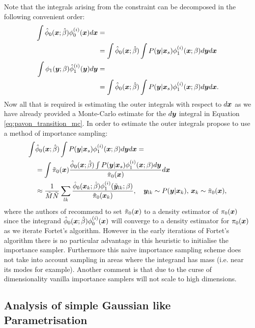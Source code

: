 \documentclass[a4paper,12pt,twoside,openright]{report}
\theoremstyle{definition}
\begin{document}
\cite{pavon2018data} Note that the integrals arising from the constraint can be decomposed in the following convenient order:
\begin{align}
\int {\hat{\phi}}_0({\bm{x}}; \hat{\beta} )   \phi_0^{(i)}({\bm{x}}) d{\bm{x}} &=\nonumber\\
& = \int  {\hat{\phi}}_0({\bm{x}}; \hat{\beta} ) \int P({\bm{y}}| {\bm{x}}_s) \phi_1^{(i)}({\bm{x}}; \beta) d{\bm{y}} d{\bm{x}} \\
    \int \phi_1({\bm{y}}; {\beta} )   {\hat{\phi}}_1^{(i)}({\bm{y}}) d{\bm{y}} &=\nonumber\\
    &=\int  {\hat{\phi}}_0({\bm{x}}; \hat{\beta} ) \int P({\bm{y}}| {\bm{x}}_s) \phi_1^{(i)}({\bm{x}}; \beta) d{\bm{y}} d{\bm{x}}.
\end{align}
Now all that is required is estimating the outer integrals with respect to $d{\bm{x}}$ as we have already provided a Monte-Carlo estimate for the $d{\bm{y}}$ integral in Equation \ref{eq:pavon_transition_mc}. In order to estimate the outer integrals  \cite{pavon2018data} propose to use a method of importance sampling:
\begin{align}
    \int&  {\hat{\phi}}_0({\bm{x}}; \hat{\beta} ) \int P({\bm{y}}| {\bm{x}}_s) \phi_1^{(i)}({\bm{x}}; \beta) d{\bm{y}} d{\bm{x}} = \nonumber \\
    & = \int \tilde{\pi}_0({\bm{x}}) \frac{{\hat{\phi}}_0({\bm{x}}; \hat{\beta} ) \int P({\bm{y}}| {\bm{x}}_s) \phi_1^{(i)}({\bm{x}}; \beta) d{\bm{y}}}{\tilde{\pi}_0({\bm{x}})} d{\bm{x}} \nonumber \\ 
     &\approx  \frac{1}{\tilde{M}\tilde{N}}\sum_{lk} \frac{{\hat{\phi}}_0({\bm{x}}_k; \hat{\beta} )\phi_1^{(i)}(\tilde{{\bm{y}}}_{lk}; \beta) }{\tilde{\pi}_0({\bm{x}}_k)} ,  \quad {\bm{y}}_{lk} \sim   P({\bm{y}}| {\bm{x}}_k), \, {\bm{x}}_k\sim\tilde{\pi}_0({\bm{x}}),
\end{align}
where the authors of \cite{pavon2018data} recommend  to set  $\tilde{\pi}_0({\bm{x}})$ to a density estimator of $\pi_0({\bm{x}})$ since the integrand  ${\hat{\phi}}_0({\bm{x}}; \hat{\beta} )\phi_0^{(i)}({\bm{x}})$ will converge  to a density estimator for  $\pi_0({\bm{x}})$ as we iterate Fortet's algorithm. However in the early iterations of Fortet's algorithm there is no particular advantage in this heuristic to initialise the importance sampler. Furthermore this naive importance sampling scheme does not take into account sampling in areas where the integrand has mass (i.e. near its modes for example). Another comment is that due to the curse of dimensionality vanilla importance samplers will not scale to high dimensions.


\subsection{Analysis of simple Gaussian like Parametrisation}
\end{document}

